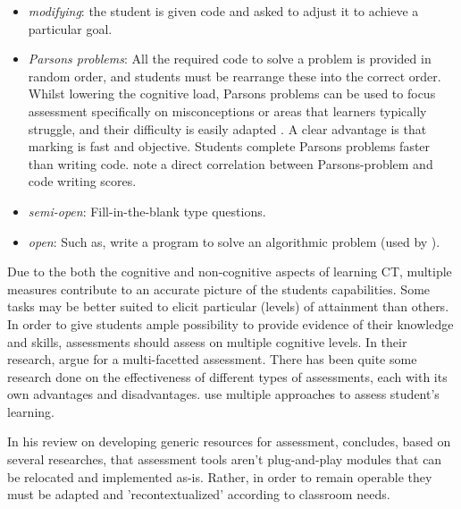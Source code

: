 \begin{itemize}
\item \emph{modifying}: the student is given code and asked to adjust it to achieve a particular goal.
\item \emph{Parsons problems}: All the required code to solve a problem is provided in random order, and students must be rearrange these into the correct order. Whilst lowering the cognitive load, Parsons problems can be used to focus assessment specifically on misconceptions or areas that learners typically struggle, and their difficulty is easily adapted \cite{ericson2017parsons}. A clear advantage is that marking is fast and objective. Students complete Parsons problems faster than writing code.  note a direct correlation between Parsons-problem and code writing scores.
\item \emph{semi-open}: Fill-in-the-blank type questions. 
\item \emph{open}: Such as, write a program to solve an algorithmic problem (used by ).
\end{itemize}



Due to the both the cognitive and non-cognitive aspects of learning CT, multiple measures contribute to an accurate picture of the students capabilities. Some tasks may be better suited to elicit particular (levels) of attainment than others. In order to give students ample possibility to provide evidence of their knowledge and skills, assessments should assess on multiple cognitive levels. In their research,  argue for a multi-facetted assessment. There has been quite some research done on the effectiveness of different types of assessments, each with its own advantages and disadvantages.  use multiple approaches to assess student's learning.




In his review on developing generic resources for assessment, \citeauthor{hermansen2014reworking} concludes, based on several researches, that assessment tools aren't plug-and-play modules that can be relocated and implemented as-is. Rather, in order to remain operable they must be adapted and 'recontextualized' according to classroom needs.

